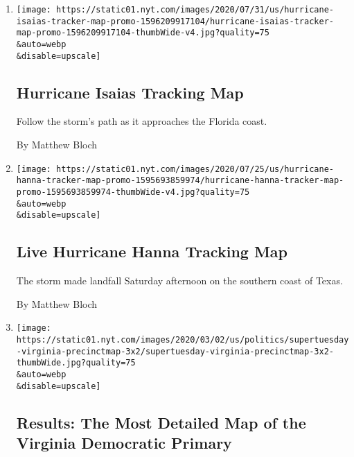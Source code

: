 \begin{enumerate}
\def\labelenumi{\arabic{enumi}.}
\item
  \href{/interactive/2020/07/31/us/hurricane-isaias-tracker-map.html}{}

  \texttt{[image: https://static01.nyt.com/images/2020/07/31/us/hurricane-isaias-tracker-map-promo-1596209917104/hurricane-isaias-tracker-map-promo-1596209917104-thumbWide-v4.jpg?quality=75\\\&auto=webp\\\&disable=upscale]}

  \hypertarget{hurricane-isaias-tracking-map}{%
  \subsection{Hurricane Isaias Tracking
  Map}\label{hurricane-isaias-tracking-map}}

  Follow the storm's path as it approaches the Florida coast.

  By Matthew Bloch
\item
  \href{/interactive/2020/07/25/us/hurricane-hanna-tracker-map.html}{}

  \texttt{[image: https://static01.nyt.com/images/2020/07/25/us/hurricane-hanna-tracker-map-promo-1595693859974/hurricane-hanna-tracker-map-promo-1595693859974-thumbWide-v4.jpg?quality=75\\\&auto=webp\\\&disable=upscale]}

  \hypertarget{live-hurricane-hanna-tracking-map}{%
  \subsection{Live Hurricane Hanna Tracking
  Map}\label{live-hurricane-hanna-tracking-map}}

  The storm made landfall Saturday afternoon on the southern coast of
  Texas.

  By Matthew Bloch
\item
  \href{/interactive/2020/03/03/us/elections/precinct-map-virginia-primary.html}{}

  \texttt{[image: https://static01.nyt.com/images/2020/03/02/us/politics/supertuesday-virginia-precinctmap-3x2/supertuesday-virginia-precinctmap-3x2-thumbWide.jpg?quality=75\\\&auto=webp\\\&disable=upscale]}

  \hypertarget{results-the-most-detailed-map-of-the-virginia-democratic-primary}{%
  \subsection{Results: The Most Detailed Map of the Virginia Democratic
  Primary}\label{results-the-most-detailed-map-of-the-virginia-democratic-primary}}


\end{enumerate}
